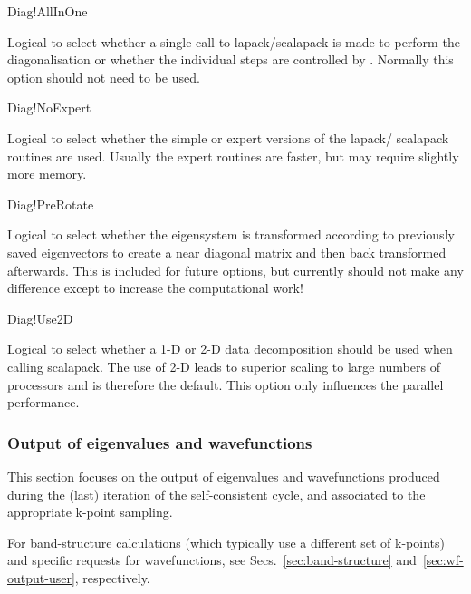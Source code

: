 \begin{fdflogicalF}{Diag!AllInOne}

  Logical to select whether a single call to lapack/scalapack is made
  to perform the diagonalisation or whether the individual steps are
  controlled by \siesta. Normally this option should not need to be
  used.
  
\end{fdflogicalF}

\begin{fdflogicalF}{Diag!NoExpert}

  Logical to select whether the simple or expert versions of the
  lapack/ scalapack routines are used. Usually the expert routines are
  faster, but may require slightly more memory.

\end{fdflogicalF}

\begin{fdflogicalF}{Diag!PreRotate}

  Logical to select whether the eigensystem is transformed according
  to previously saved eigenvectors to create a near diagonal matrix
  and then back transformed afterwards. This is included for future
  options, but currently should not make any difference except to
  increase the computational work!
  
\end{fdflogicalF}


\begin{fdflogicalT}{Diag!Use2D}

  Logical to select whether a 1-D or 2-D data decomposition should be
  used when calling scalapack. The use of 2-D leads to superior
  scaling to large numbers of processors and is therefore the
  default. This option only influences the parallel performance.
  
\end{fdflogicalT}


\subsubsection{Output of eigenvalues and wavefunctions}

This section focuses on the output of eigenvalues and wavefunctions
produced during the (last) iteration of the self-consistent cycle,
and associated to the appropriate k-point sampling.

For band-structure calculations (which typically use a different set
of k-points) and specific requests for wavefunctions, see
Secs.~\ref{sec:band-structure} and~\ref{sec:wf-output-user}, respectively.

